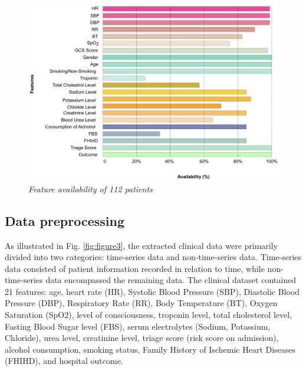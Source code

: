 \documentclass[journal,article,submit,pdftex,moreauthors]{Definitions/mdpi}
\begin{document}
\begin{figure}[hbt!]
    \centering
    \includegraphics[width=1\linewidth]{images/featureAvailability.pdf}
    \caption{\textit{Feature availability of 112 patients}}
    \label{fig:figure2}
    \vspace{-10pt}
\end{figure}

\subsection{Data preprocessing}

As illustrated in Fig. \ref{fig:figure3}, the extracted clinical data were primarily divided into two categories: time-series data and non-time-series data. Time-series data consisted of patient information recorded in relation to time, while non-time-series data encompassed the remaining data. The clinical dataset contained 21 features: age, heart rate (HR), Systolic Blood Pressure (SBP), Diastolic Blood Pressure (DBP), Respiratory Rate (RR), Body Temperature (BT), Oxygen Saturation (SpO2), level of consciousness, troponin level, total cholesterol level, Fasting Blood Sugar level (FBS), serum electrolytes (Sodium, Potassium, Chloride), urea level, creatinine level, triage score (risk score on admission), alcohol consumption, smoking status, Family History of Ischemic Heart Diseases (FHIHD), and hospital outcome.
\end{document}

